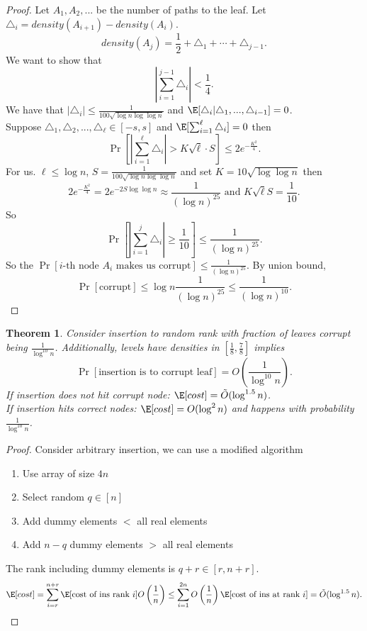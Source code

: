 \documentclass[a4paper]{article}
\newtheorem{thm}{Theorem}[section]
\begin{document}
\begin{proof}
    Let $A_1,A_2,...$ be the number of paths to the leaf. Let $\triangle_i=density(A_{i+1})-density(A_i)$. 
    \[
    density(A_j)=\frac{1}{2}+\triangle_1+\cdots +\triangle_{j-1}
    .\] 
    We want to show that \[
    \left |\sum_{i=1}^{j-1}\triangle_i \right |<\frac{1}{4}
    .\] 
    We have that $|\triangle_i|\leq \frac{1}{100 \sqrt{\log n\log \log n}}$ and $\E[\triangle_i|\triangle_1,...,\triangle_{i-1}]=0$. \\
    Suppose $\triangle_1,\triangle_2,...,\triangle_\ell\in [-s,s]$ and $\E[\sum_{i=1}^\ell \triangle_i]=0$ then 
    \[
    \Pr[|\sum_{i=1}^\ell \triangle_i|>K\sqrt{\ell}\cdot S]\leq 2e^{-\frac{K^2}{4}}
    .\] 
    For us. $\ell\leq \log n$, $S= \frac{1}{100 \sqrt{\log n \log\log n}}$ and set $K=10\sqrt{\log\log n}$ then \[
        2e^{-\frac{K^2}{4}}=2e^{-2S\log \log n}\approx \frac{1}{(\log n)^{25}} \text{ and } K\sqrt{\ell} S=\frac{1}{10}
    .\] 
    So \[
    \Pr\left [\left |\sum_{i=1}^j \triangle_i \right |\geq \frac{1}{10}\right ]\leq \frac{1}{(\log n)^{25}}
    .\] 
    So the $\Pr[ i\text{-th node $A_i$ makes us corrupt}]\leq \frac{1}{(\log n)^{25}}$. By union bound, 
    \[
    \Pr[ \text{corrupt}]\leq \log n \frac{1}{(\log n)^{25}}\leq \frac{1}{(\log n)^{10}}
    .\] 
\end{proof}
\begin{thm}
    Consider insertion to random rank with fraction of leaves corrupt being $\frac{1}{\log^{10} n}$. Additionally, levels have densities in $[\frac{1}{8}, \frac{7}{8}]$ implies \[
    \Pr[ \text{insertion is to corrupt leaf}]=O \left( \frac{1}{\log^10 n} \right)
    .\] 
    If insertion does not hit corrupt node: $\E[cost]=\tilde{O}(\log^{1.5} n)$. \\
    If insertion hits correct nodes: $\E[cost]=O(\log^2 n)$ and happens with probability $\frac{1}{\log^10 n}$. 
\end{thm}
\begin{proof}
    Consider arbitrary insertion, we can use a modified algorithm
    \begin{enumerate}
        \item Use array of size $4n$
        \item Select random $q\in [n]$
        \item Add dummy elements $<$ all real elements
        \item Add $n-q$ dummy elements $>$ all real elements 
    \end{enumerate}
    The rank including dummy elements is $q+r\in [r,n+r]$.
    \[
    \E[cost]=\sum_{i=r}^{n+r} \E[ \text{cost of ins rank } i] O\left (\frac{1}{n} \right)\leq \sum_{i=1}^{2n}O\left (\frac{1}{n} \right)\E[ \text{cost of ins at rank } i]=\tilde{O}(\log^{1.5}n)
    .\] 
\end{proof}
\newpage
\end{document}
